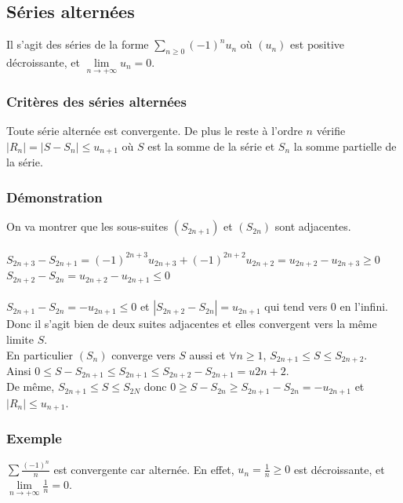 \documentclass[a4paper,10pt]{book} %
\newcommand{\abs}[1]{\left|#1\right|}
\begin{document}
\subsection{Séries alternées}
Il s'agit des séries de la forme $\sum_{n\geq 0}(-1)^n u_n$ où $(u_n)$ est positive décroissante, et $\lim\limits_{n\rightarrow +\infty}u_n=0$.

\subsubsection{Critères des séries alternées}
Toute série alternée est convergente. De plus le reste à l'ordre $n$ vérifie $\abs{R_n}=\abs{S-S_n}\leq u_{n+1}$
où $S$ est la somme de la série et $S_n$ la somme partielle de la série.

\subsubsection{Démonstration}
On va montrer que les sous-suites $(S_{2n+1})$ et $(S_{2n})$ sont adjacentes.\\\\
$S_{2n+3}-S_{2n+1}=(-1)^{2n+3}u_{2n+3}+(-1)^{2n+2}u_{2n+2}=u_{2n+2}-u_{2n+3}\geq 0$\\
$S_{2n+2}-S_{2n}=u_{2n+2}-u_{2n+1}\leq 0$\\\\
$S_{2n+1}-S_{2n}=-u_{2n+1}\leq 0$ et $\abs{S_{2n+2}-S_{2n}}=u_{2n+1}$ qui tend vers 0 en l'infini.\\

Donc il s'agit bien de deux suites adjacentes et elles convergent vers la même limite $S$.\\
En particulier $(S_n)$ converge vers $S$ aussi et $\forall n\geq 1$, $S_{2n+1}\leq S\leq S_{2n+2}$.\\

Ainsi $0\leq S-S_{2n+1}\leq S_{2n+1}\leq S_{2n+2}-S_{2n+1}=u{2n+2}$.\\
De même, $S_{2n+1}\leq S\leq S_{2N}$ donc $0\geq S-S_{2n}\geq S_{2n+1}-S_{2n}=-u_{2n+1}$ et $\abs{R_n}\leq u_{n+1}$.

\subsubsection{Exemple}
$\sum \frac{(-1)^n}{n}$ est convergente car alternée. En effet, $u_n=\frac{1}{n}\geq 0$ est décroissante, et $\lim\limits_{n\rightarrow+\infty}\frac{1}{n}=0$.

\newpage
\end{document}
